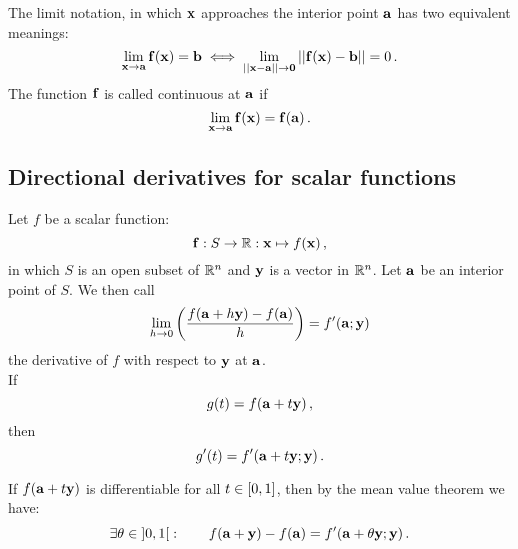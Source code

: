         The limit notation, in which $\vb{x}$ approaches the interior point $\vb{a}$ has two equivalent meanings:
        \begin{equation}
            \lim_{\vb{x} \to \vb{a}} \vb{f}(\vb{x}) = \vb{b} \iff \lim_{ ||\vb{x} - \vb{a}|| \to \vb{0}} ||\vb{f}(\vb{x}) - \vb{b}|| = 0 \thinspace .
        \end{equation}
        The function $\vb{f}$ is called continuous at $\vb{a}$ if
        \begin{equation}
            \lim_{\vb{x} \to \vb{a}} \vb{f}(\vb{x}) = \vb{f}(\vb{a}) \thinspace .
        \end{equation}

    \subsection{Directional derivatives for scalar functions}
        Let $f$ be a scalar function:
        \begin{equation}
            \vb{f}: S \rightarrow \mathbb{R}: \vb{x} \mapsto f(\vb{x}) \thinspace ,
        \end{equation}
        in which $S$ is an open subset of $\mathbb{R}^n$ and $\vb{y}$ is a vector in $\mathbb{R}^n$. Let $\vb{a}$ be an interior point of $S$. We then call
        \begin{equation}
            \lim_{h \to 0} \qty( \frac{f(\vb{a} + h\vb{y}) - f(\vb{a})}{h} ) = f'(\vb{a};\vb{y})
        \end{equation}
        the derivative of $f$ with respect to $\vb{y}$ at $\vb{a}$. \\

        If
        \begin{equation}
            g(t) = f(\vb{a} + t \vb{y}) \thinspace ,
        \end{equation}
        then
        \begin{equation}
            g'(t) = f'(\vb{a} + t \vb{y}; \vb{y}) \thinspace .
        \end{equation}

        If $f(\vb{a} + t \vb{y})$ is differentiable for all $t \in \interval{0}{1}$, then by the mean value theorem we have:
        \begin{equation}
            \exists \theta \in \interval[open]{0}{1}: \qquad f(\vb{a} + \vb{y}) - f(\vb{a}) = f'(\vb{a} + \theta \vb{y}; \vb{y}) \thinspace .
        \end{equation}

